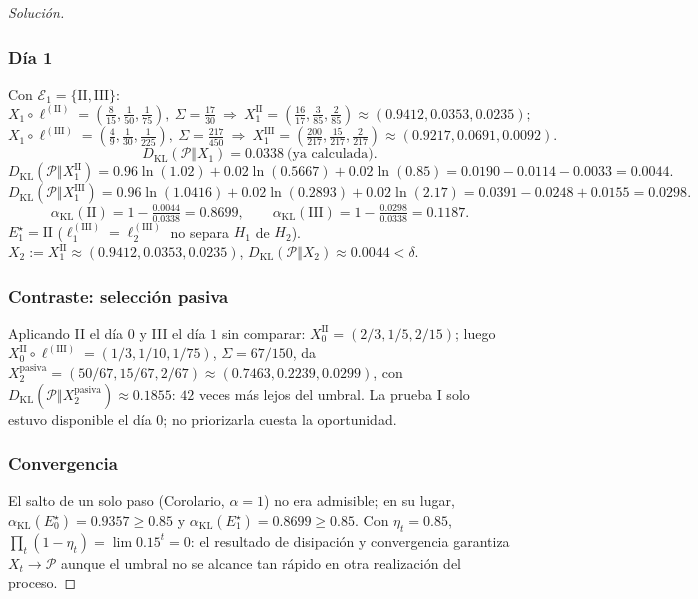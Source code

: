 ﻿\documentclass[12pt]{article}
\begin{document}
\begin{proof}[Solución]
\subsubsection*{Día 1}
Con $\mathcal E_1=\{\mathrm{II},\mathrm{III}\}$:
\[
X_1\circ\ell^{(\mathrm{II})}=\left(\tfrac{8}{15},\tfrac{1}{50},\tfrac{1}{75}\right),\ \Sigma=\tfrac{17}{30}
\ \Rightarrow\
X_1^{\mathrm{II}}=\left(\tfrac{16}{17},\tfrac{3}{85},\tfrac{2}{85}\right)\approx(0.9412,0.0353,0.0235);
\]
\[
X_1\circ\ell^{(\mathrm{III})}=\left(\tfrac{4}{9},\tfrac{1}{30},\tfrac{1}{225}\right),\ \Sigma=\tfrac{217}{450}
\ \Rightarrow\
X_1^{\mathrm{III}}=\left(\tfrac{200}{217},\tfrac{15}{217},\tfrac{2}{217}\right)\approx(0.9217,0.0691,0.0092).
\]
\[
D_{\mathrm{KL}}(\mathcal P\Vert X_1)=0.0338\ \text{(ya calculada)}.
\]
\[
D_{\mathrm{KL}}(\mathcal P\Vert X_1^{\mathrm{II}})=0.96\ln(1.02)+0.02\ln(0.5667)+0.02\ln(0.85)=0.0190-0.0114-0.0033=0.0044.
\]
\[
D_{\mathrm{KL}}(\mathcal P\Vert X_1^{\mathrm{III}})=0.96\ln(1.0416)+0.02\ln(0.2893)+0.02\ln(2.17)=0.0391-0.0248+0.0155=0.0298.
\]
\[
\alpha_{\mathrm{KL}}(\mathrm{II})=1-\tfrac{0.0044}{0.0338}=0.8699,\qquad
\alpha_{\mathrm{KL}}(\mathrm{III})=1-\tfrac{0.0298}{0.0338}=0.1187.
\]
$E_1^\star=\mathrm{II}$ ($\ell_1^{(\mathrm{III})}=\ell_2^{(\mathrm{III})}$ no separa $H_1$ de $H_2$). $X_2:=X_1^{\mathrm{II}}\approx(0.9412,0.0353,0.0235)$, $D_{\mathrm{KL}}(\mathcal P\Vert X_2)\approx0.0044<\delta$.

\subsubsection*{Contraste: selección pasiva}
Aplicando II el día $0$ y III el día $1$ sin comparar: $X_0^{\mathrm{II}}=(2/3,1/5,2/15)$; luego $X_0^{\mathrm{II}}\circ\ell^{(\mathrm{III})}=(1/3,1/10,1/75)$, $\Sigma=67/150$, da $X_2^{\text{pasiva}}=(50/67,15/67,2/67)\approx(0.7463,0.2239,0.0299)$, con $D_{\mathrm{KL}}(\mathcal P\Vert X_2^{\text{pasiva}})\approx0.1855$: $42$ veces más lejos del umbral. La prueba I solo estuvo disponible el día $0$; no priorizarla cuesta la oportunidad.

\subsubsection*{Convergencia}
El salto de un solo paso (Corolario, $\alpha=1$) no era admisible; en su lugar, $\alpha_{\mathrm{KL}}(E_0^\star)=0.9357\ge0.85$ y $\alpha_{\mathrm{KL}}(E_1^\star)=0.8699\ge0.85$. Con $\eta_t=0.85$, $\prod_t(1-\eta_t)=\lim 0.15^t=0$: el resultado de disipación y convergencia garantiza $X_t\to\mathcal P$ aunque el umbral no se alcance tan rápido en otra realización del proceso.
\end{proof}
\end{document}
